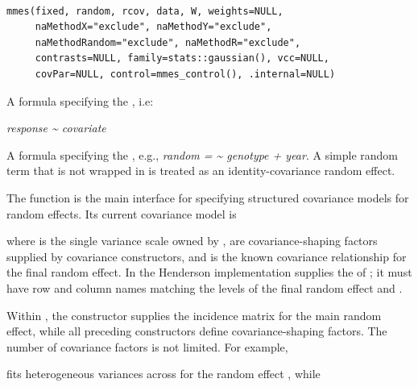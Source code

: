 \documentclass[a4paper]{book}
\begin{document}
%
\begin{Usage}
\begin{verbatim}

mmes(fixed, random, rcov, data, W, weights=NULL,
     naMethodX="exclude", naMethodY="exclude",
     naMethodRandom="exclude", naMethodR="exclude",
     contrasts=NULL, family=stats::gaussian(), vcc=NULL,
     covPar=NULL, control=mmes_control(), .internal=NULL)
\end{verbatim}
\end{Usage}
%
\begin{Arguments}
\begin{ldescription}
\item[\code{fixed}] A formula specifying the  , i.e:

\emph{response \textasciitilde{} covariate}



\item[\code{random}] A formula specifying the , e.g.,
\emph{random = \textasciitilde{} genotype + year}. A simple random term that is not wrapped
in  is treated as an identity-covariance random effect.

The  function is the main interface for specifying structured
covariance models for random effects. Its current covariance model is


where  is the single variance scale owned by ,
 are covariance-shaping factors supplied by covariance
constructors, and  is the known covariance relationship for the final
random effect. In the Henderson implementation  supplies the
 of ; it must have row and column names matching the
levels of the final random effect and .

Within , the  constructor supplies the incidence
matrix for the main random effect, while all preceding constructors define
covariance-shaping factors. The number of covariance factors is not limited.
For example,


fits heterogeneous variances across  for the random effect
, while


\end{ldescription}
\end{Arguments}
\end{document}
